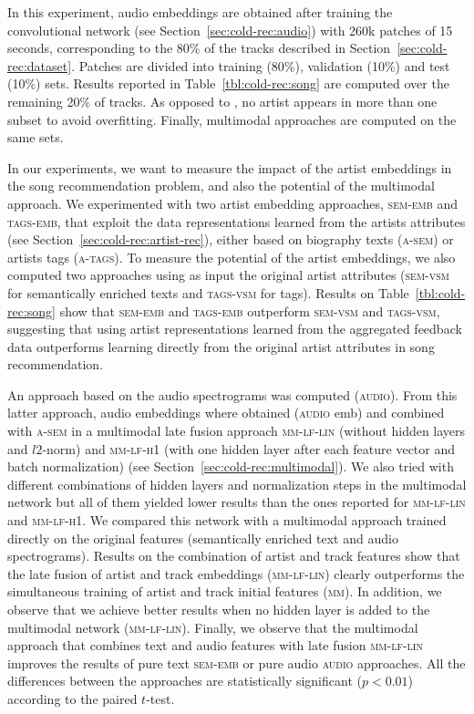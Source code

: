 In this experiment, audio embeddings are obtained after training the convolutional network (see Section~\ref{sec:cold-rec:audio}) with 260k patches of 15 seconds, corresponding to the 80\% of the tracks described in Section~\ref{sec:cold-rec:dataset}. Patches are divided into training (80\%), validation (10\%) and test (10\%) sets. Results reported in Table~\ref{tbl:cold-rec:song} are computed over the remaining 20\% of tracks. %
As opposed to \cite{Oord2013}, no artist appears in more than one subset to avoid overfitting. Finally, multimodal approaches are computed on the same sets.

In our experiments, we want to measure the impact of the artist embeddings in the song recommendation problem, and also the potential of the multimodal approach. We experimented with two artist embedding approaches, \textsc{sem-emb} and \textsc{tags-emb}, that exploit the data representations learned from the artists attributes (see Section~\ref{sec:cold-rec:artist-rec}), either based on biography texts (\textsc{a-sem}) or artists tags (\textsc{a-tags}). To measure the potential of the artist embeddings, we also computed two approaches using as input the original artist attributes (\textsc{sem-vsm} for semantically enriched texts and \textsc{tags-vsm} for tags). Results on Table~\ref{tbl:cold-rec:song} show that \textsc{sem-emb} and \textsc{tags-emb} outperform \textsc{sem-vsm} and \textsc{tags-vsm}, suggesting that using artist representations learned from the aggregated feedback data outperforms learning directly from the original artist attributes in song recommendation.

An approach based on the audio spectrograms was computed (\textsc{audio}). From this latter approach, audio embeddings where obtained (\textsc{audio} emb) and combined with \textsc{a-sem} in a multimodal late fusion approach \textsc{mm-lf-lin} (without hidden layers and $l2$-norm) and \textsc{mm-lf-h1} (with one hidden layer after each feature vector and batch normalization) (see Section~\ref{sec:cold-rec:multimodal}). We also tried with different combinations of hidden layers and normalization steps in the multimodal network but all of them yielded lower results than the ones reported for \textsc{mm-lf-lin} and \textsc{mm-lf-h1}. We compared this network with a multimodal approach trained directly on the original features (semantically enriched text and audio spectrograms). Results on the combination of artist and track features show that the late fusion of artist and track embeddings (\textsc{mm-lf-lin}) clearly outperforms the simultaneous training of artist and track initial features (\textsc{mm}). In addition, we observe that we achieve better results when no hidden layer is added to the multimodal network (\textsc{mm-lf-lin}). Finally, we observe that the multimodal approach that combines text and audio features with late fusion \textsc{mm-lf-lin} improves the results of pure text \textsc{sem-emb} or pure audio \textsc{audio} approaches. All the differences between the approaches are statistically significant ($p < 0.01$) according to the paired $t$-test.

